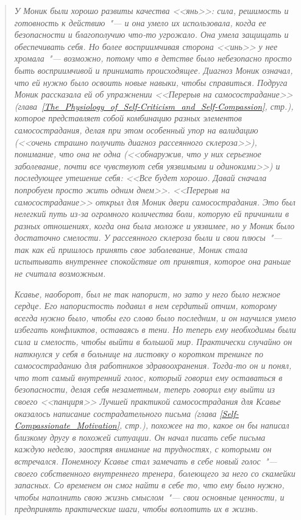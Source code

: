\begin{quotation}
	\textit{У Моник были хорошо развиты качества <<янь>>: сила, решимость и готовность к действию~"--- и она умело их использовала, когда ее безопасности и благополучию что-то угрожало. Она умела защищать и обеспечивать себя. Но более восприимчивая сторона <<инь>> у нее хромала~"--- возможно, потому что в детстве было небезопасно просто быть восприимчивой и принимать происходящее. Диагноз Моник означал, что ей нужно было освоить новые навыки, чтобы справиться. Подруга Моник рассказала ей об упражнении <<Перерыв на самосострадание>> (глава~\ref{The_Physiology_of_Self-Criticism_and_Self-Compassion}, стр.\:\pageref{IP:Self-Compassion_Break}), которое представляет собой комбинацию разных элементов самосострадания, делая при этом особенный упор на валидацию (<<очень страшно получить диагноз рассеянного склероза>>), понимание, что она не одна (<<обнаружив, что у них серьезное заболевание, почти все чувствуют себя уязвимыми и одинокими>>) и последующее утешение себя: <<Все будет хорошо. Давай сначала попробуем просто жить одним днем>>. <<Перерыв на самосострадание>> открыл для Моник двери самосострадания. Это был нелегкий путь из-за огромного количества боли, которую ей причинили в разных отношениях, когда она была моложе и уязвимее, но у Моник было достаточно смелости. У рассеянного склероза были и свои плюсы~"--- так как ей пришлось принять свое заболевание, Моник стала испытывать внутреннее спокойствие от принятия, которое она раньше не считала возможным.}
		
	\textit{Ксавье, наоборот, был не так напорист, но зато у него было нежное сердце. Его напористость подавил в нем сердитый отчим, которому всегда нужно было, чтобы его слово было последним, и он научился умело избегать конфликтов, оставаясь в тени. Но теперь ему необходимы были сила и смелость, чтобы выйти в большой мир. Практически случайно он наткнулся у себя в больнице на листовку о коротком тренинге по самосостраданию для работников здравоохранения. Тогда-то он и понял, что тот самый внутренний голос, который говорил ему оставаться в безопасности, делая себя незаметным, теперь говорил ему выйти из своего <<панциря>> Лучшей практикой самосострадания для Ксавье оказалось написание сострадательного письма (глава \ref{Self-Compassionate_Motivation}, стр.\:\pageref{IP:Compassionate_Letter_to_Myself}), похожее на то, какое он бы написал близкому другу в похожей ситуации. Он начал писать себе письма каждую неделю, заостряя внимание на трудностях, с которыми он встречался. Понемногу Ксавье стал замечать в себе новый голос~"--- своего собственного внутреннего тренера, болеющего за него со скамейки запасных. Со временем он смог найти в себе то, что ему было нужно, чтобы наполнить свою жизнь смыслом~"--- свои основные ценности, и предпринять практические шаги, чтобы воплотить их в жизнь.}
\end{quotation}

